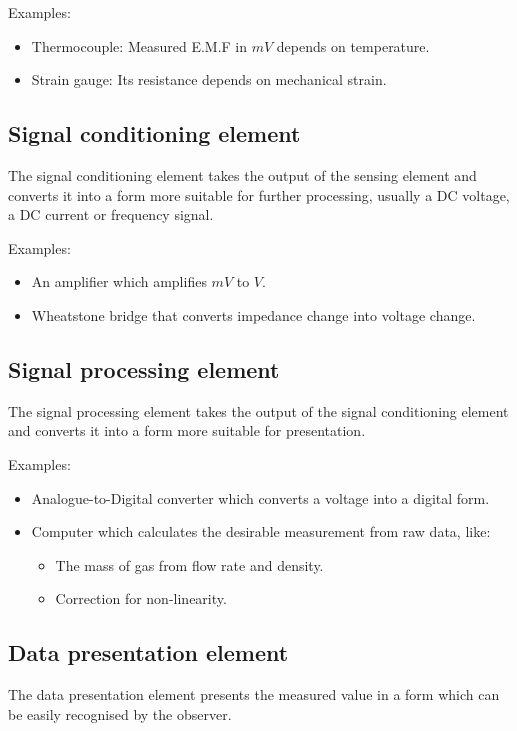 \documentclass[11pt]{article}
\begin{document}
Examples:
\begin{itemize}
\item Thermocouple: Measured E.M.F in \(\unit{mV}\) depends on temperature.
\item Strain gauge: Its resistance depends on mechanical strain.
\end{itemize}

\subsection{Signal conditioning element}
\label{sec:org6caef79}
The signal conditioning element takes the output of the sensing element and converts it into a form more suitable for further processing, usually a DC voltage, a DC current or frequency signal.

Examples:
\begin{itemize}
\item An amplifier which amplifies \(\unit{mV}\) to \(\unit{V}\).
\item Wheatstone bridge that converts impedance change into voltage change.
\end{itemize}

\subsection{Signal processing element}
\label{sec:org88c3968}
The signal processing element takes the output of the signal conditioning element and converts it into a form more suitable for presentation.

Examples:
\begin{itemize}
\item Analogue-to-Digital converter which converts a voltage into a digital form.
\item Computer which calculates the desirable measurement from raw data, like:
\begin{itemize}
\item The mass of gas from flow rate and density.
\item Correction for non-linearity.
\end{itemize}
\end{itemize}

\subsection{Data presentation element}
\label{sec:orgca8e1cd}
The data presentation element presents the measured value in a form which can be easily recognised by the observer.
\end{document}
